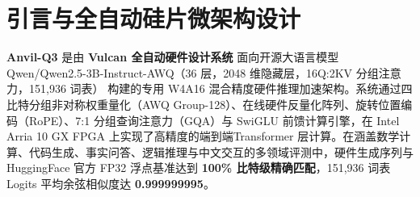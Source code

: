 \documentclass[11pt,a4paper]{article}
\begin{document}
\section{引言与全自动硅片微架构设计}

\textbf{Anvil-Q3} 是由 \textbf{Vulcan 全自动硬件设计系统} 面向开源大语言模型 Qwen/\allowbreak{}Qwen2.5-3B-Instruct-AWQ（36 层，2048 维隐藏层，16Q:2KV 分组注意力，151,\allowbreak{}936 词表） 构建的专用 W4A16 混合精度硬件推理加速架构。系统通过四比特分组非对称权重量化（AWQ Group-128）、在线硬件反量化阵列、旋转位置编码（RoPE）、7:1 分组查询注意力（GQA）与 SwiGLU 前馈计算引擎，在 Intel Arria 10 GX FPGA 上实现了高精度的端到端Transformer 层计算。在涵盖数学计算、代码生成、事实问答、逻辑推理与中文交互的多领域评测中，硬件生成序列与 HuggingFace 官方 FP32 浮点基准达到 \textbf{100\% 比特级精确匹配}，151,936 词表 Logits 平均余弦相似度达 \textbf{0.999999995}。

\vspace{2pt}
\end{document}

